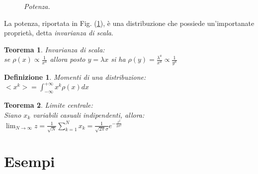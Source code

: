 \documentclass[12pt, a4paper]{book}
\theoremstyle{theorem}
\newtheorem{definition}{Definizione}[section]
\newtheorem{theorem}{Teorema}[section]
\begin{document}
		\begin{figure}[H]
			\centering
			\caption{\emph{Potenza.}}
			\label{figure:potenza}
		\end{figure}
		La potenza, riportata in Fig. (\ref{figure:potenza}), è una distribuzione che possiede un'importanate proprietà, detta \emph{invarianza di scala}.
		\begin{theorem}
			Invarianza di scala:\\
			se $\rho(x)\propto\frac{1}{x^a}$ allora posto $y=\lambda x$ si ha $\rho(y)=\frac{\lambda^a}{x^a}\propto\frac{1}{y^a}$
		\end{theorem}
		\begin{definition}
			Momenti di una distribuzione:\\
			$<x^k>=\int_{-\infty}^{+\infty}x^k\rho(x)dx$
		\end{definition}
		\begin{theorem}
			Limite centrale:\\
			Siano ${x_k}$ variabili casuali indipendenti, allora:\\
			$\lim_{N\to\infty}z=\frac{1}{\sqrt{N}}\sum_{k=1}^{N}x_k=\frac{1}{\sqrt{2\pi}\sigma}e^{-\frac{z^2}{2\sigma^2}}$
		\end{theorem}

		\section{Esempi}
\end{document}
